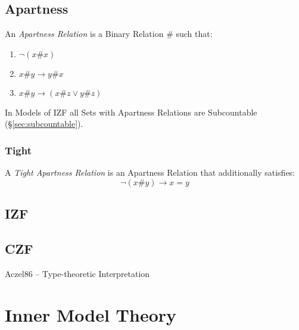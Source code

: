 \subsection{Apartness}\label{sec:apartness}

An \emph{Apartness Relation} is a Binary Relation $\#$ such that:

\begin{enumerate}
\item $\neg (x\#x)$
\item $x\#y \rightarrow y\#x$
\item $x\#y \rightarrow (x\#z \vee y\#z)$
\end{enumerate}

In Models of IZF all Sets with Apartness Relations are Subcountable
(\S\ref{sec:subcountable}).



\subsubsection{Tight}\label{sec:tight}

A \emph{Tight Apartness Relation} is an Apartness Relation that
additionally satisfies:
\[
  \neg (x \# y) \rightarrow x = y
\]



\subsection{IZF}\label{sec:izf}

\subsection{CZF}\label{sec:czf}

Aczel86 -- Type-theoretic Interpretation



\section{Inner Model Theory}\label{sec:inner_model_theory}
